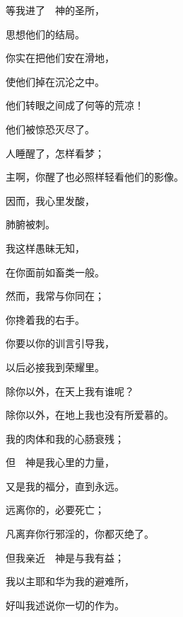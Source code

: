 {\par }{\Q {}等我进了　神的圣所，
\par }{\Q 思想他们的结局。
\par }{\Q {}你实在把他们安在滑地，
\par }{\Q 使他们掉在沉沦之中。
\par }{\Q {}他们转眼之间成了何等的荒凉！
\par }{\Q 他们被惊恐灭尽了。
\par }{\Q {}人睡醒了，怎样看梦；
\par }{\Q 主啊，你醒了也必照样轻看他们的影像。
\par }{\BB \par }{\Q {}因而，我心里发酸，
\par }{\Q 肺腑被刺。
\par }{\Q {}我这样愚昧无知，
\par }{\Q 在你面前如畜类一般。
\par }{\Q {}然而，我常与你同在；
\par }{\Q 你搀着我的右手。
\par }{\Q {}你要以你的训言引导我，
\par }{\Q 以后必接我到荣耀里。
\par }{\Q {}除你以外，在天上我有谁呢？
\par }{\Q 除你以外，在地上我也没有所爱慕的。
\par }{\Q {}我的肉体和我的心肠衰残；
\par }{\Q 但　神是我心里的力量，
\par }{\Q 又是我的福分，直到永远。
\par }{\BB \par }{\Q {}远离你的，必要死亡；
\par }{\Q 凡离弃你行邪淫的，你都灭绝了。
\par }{\Q {}但我亲近　神是与我有益；
\par }{\Q 我以主耶和华为我的避难所，
\par }{\Q 好叫我述说你一切的作为。

}

